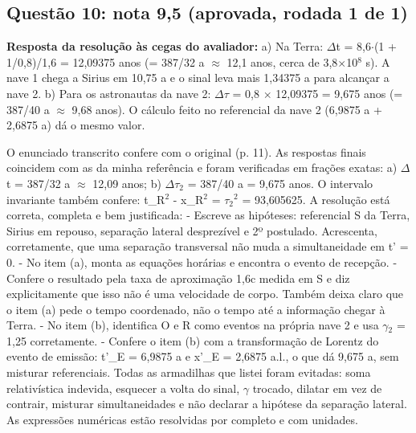 \documentclass{article}%
\begin{document}
\subsection*{Questão 10: nota 9,5 (aprovada, rodada 1 de 1)}%
\textbf{Resposta da resolução às cegas do avaliador:} a) Na Terra: $\Delta$t = 8,6$\cdot$(1 + 1/0,8)/1,6 = 12,09375 anos (= 387/32 a $\approx$ 12,1 anos, cerca de 3,8$\times$10$^{8}$ s). A nave 1 chega a Sirius em 10,75 a e o sinal leva mais 1,34375 a para alcançar a nave 2.\newline%
b) Para os astronautas da nave 2: $\Delta$$\tau$ = 0,8 $\times$ 12,09375 = 9,675 anos (= 387/40 a $\approx$ 9,68 anos). O cálculo feito no referencial da nave 2 (6,9875 a + 2,6875 a) dá o mesmo valor.\par %
O enunciado transcrito confere com o original (p. 11). As respostas finais coincidem com as da minha referência e foram verificadas em frações exatas: a) $\Delta$t = 387/32 a $\approx$ 12,09 anos; b) $\Delta$$\tau$$_{2}$ = 387/40 a = 9,675 anos. O intervalo invariante também confere: t\_R$^2$ - x\_R$^2$ = $\tau$$_{2}$$^2$ = 93,605625.\newline%
\newline%
A resolução está correta, completa e bem justificada:\newline%
{-} Escreve as hipóteses: referencial S da Terra, Sirius em repouso, separação lateral desprezível e 2º postulado. Acrescenta, corretamente, que uma separação transversal não muda a simultaneidade em t' = 0.\newline%
{-} No item (a), monta as equações horárias e encontra o evento de recepção.\newline%
{-} Confere o resultado pela taxa de aproximação 1,6c medida em S e diz explicitamente que isso não é uma velocidade de corpo. Também deixa claro que o item (a) pede o tempo coordenado, não o tempo até a informação chegar à Terra.\newline%
{-} No item (b), identifica O e R como eventos na própria nave 2 e usa $\gamma$$_{2}$ = 1,25 corretamente.\newline%
{-} Confere o item (b) com a transformação de Lorentz do evento de emissão: t'\_E = 6,9875 a e x'\_E = 2,6875 a.l., o que dá 9,675 a, sem misturar referenciais.\newline%
\newline%
Todas as armadilhas que listei foram evitadas: soma relativística indevida, esquecer a volta do sinal, $\gamma$ trocado, dilatar em vez de contrair, misturar simultaneidades e não declarar a hipótese da separação lateral. As expressões numéricas estão resolvidas por completo e com unidades.\newline%
\end{document}
